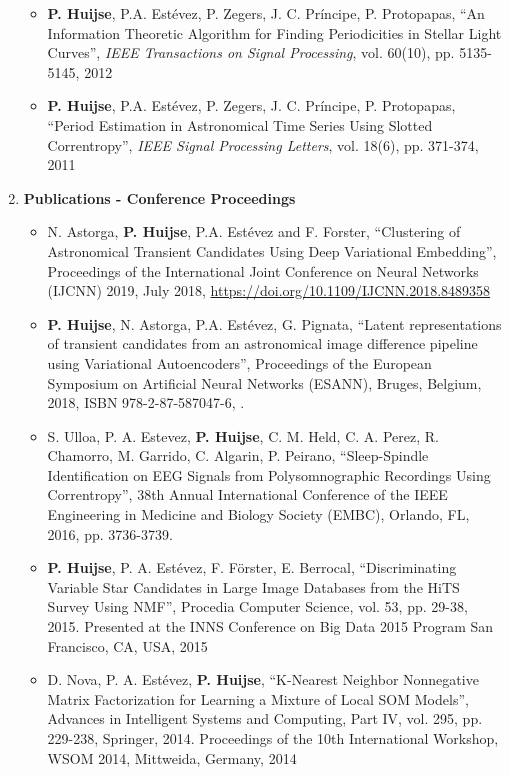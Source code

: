 \documentclass[letterpaper,11pt]{article}
\newcommand{\compactlist}{\setlength{\parskip}{0pt} \setlength{\leftskip}{2em}}
\begin{document}
\begin{enumerate}[I]
\begin{itemize}
        \item  \textbf{P. Huijse}, P.A. Estévez, P. Zegers, J. C. Príncipe, P. Protopapas, ``An Information Theoretic Algorithm for Finding Periodicities in Stellar Light Curves'', \emph{IEEE Transactions on Signal Processing}, vol. 60(10), pp. 5135-5145, 2012
        \item \textbf{P. Huijse}, P.A. Estévez, P. Zegers, J. C. Príncipe, P. Protopapas, ``Period Estimation in Astronomical Time Series Using Slotted Correntropy'', \emph{IEEE Signal Processing Letters}, vol. 18(6), pp. 371-374, 2011
	\end{itemize}


    \item \textbf{Publications - Conference Proceedings}

	\begin{itemize}  \compactlist{}
        \item  N. Astorga, \textbf{P. Huijse}, P.A. Est\'evez and F. Forster, ``Clustering of Astronomical Transient Candidates Using Deep Variational Embedding'', Proceedings of the International Joint Conference on Neural Networks (IJCNN) 2019, July 2018, \url{https://doi.org/10.1109/IJCNN.2018.8489358}            
        \item \textbf{P. Huijse}, N. Astorga, P.A. Est\'evez, G. Pignata, ``Latent representations of transient candidates from an astronomical image difference pipeline using Variational Autoencoders'', Proceedings of the European Symposium on Artificial Neural Networks (ESANN), Bruges, Belgium, 2018, ISBN 978-2-87-587047-6, \href{https://www.elen.ucl.ac.be/esann/proceedings/papers.php?ann=2018}{\faExternalLink}.
        \item S. Ulloa, P. A. Estevez, \textbf{P. Huijse}, C. M. Held, C. A. Perez, R. Chamorro, M. Garrido, C. Algarin, P. Peirano, ``Sleep-Spindle Identification on EEG Signals from Polysomnographic Recordings Using Correntropy'', 38th Annual International Conference of the IEEE Engineering in Medicine and Biology Society (EMBC), Orlando, FL, 2016, pp. 3736-3739.
        \item \textbf{P. Huijse}, P. A. Estévez, F. Förster, E. Berrocal, ``Discriminating Variable Star Candidates in Large Image Databases from the HiTS Survey Using NMF'', Procedia Computer Science, vol. 53, pp. 29-38, 2015. Presented at the INNS Conference on Big Data 2015 Program San Francisco, CA, USA, 2015
        \item D. Nova, P. A. Estévez, \textbf{P. Huijse}, ``K-Nearest Neighbor Nonnegative Matrix Factorization for Learning a Mixture of Local SOM Models'', Advances in Intelligent Systems and Computing, Part IV, vol. 295, pp. 229-238, Springer, 2014. Proceedings of the 10th International Workshop, WSOM 2014, Mittweida, Germany,  2014

\end{itemize}
\end{enumerate}
\end{document}
